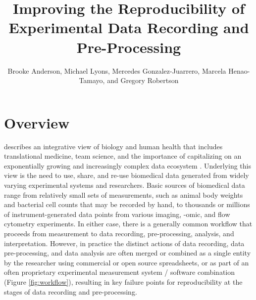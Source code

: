 \documentclass[]{tufte-book}
\title{Improving the Reproducibility of Experimental Data Recording and Pre-Processing}
\author{Brooke Anderson, Michael Lyons, Mercedes Gonzalez-Juarrero, Marcela Henao-Tamayo, and Gregory Robertson}
\date{}
\begin{document}
\maketitle



{
\setcounter{tocdepth}{1}
\tableofcontents
}

\hypertarget{overview}{%
\chapter{Overview}\label{overview}}

 \citep{nih2016strategic}
describes an integrative view of biology and human health that includes
translational medicine, team science, and the importance of capitalizing on an
exponentially growing and increasingly complex data ecosystem \citep{nih2018data}.
Underlying this view is the need to use, share, and re-use biomedical data
generated from widely varying experimental systems and researchers. Basic
sources of biomedical data range from relatively small sets of measurements,
such as animal body weights and bacterial cell counts that may be recorded by
hand, to thousands or millions of instrument-generated data points from various
imaging, -omic, and flow cytometry experiments. In either case, there is a
generally common workflow that proceeds from measurement to data recording,
pre-processing, analysis, and interpretation. However, in practice the distinct
actions of data recording, data pre-processing, and data analysis are often
merged or combined as a single entity by the researcher using commercial or open
source spreadsheets, or as part of an often proprietary experimental measurement
system / software combination (Figure \ref{fig:workflow}), resulting in key
failure points for reproducibility at the stages of data recording and
pre-processing.
\end{document}
